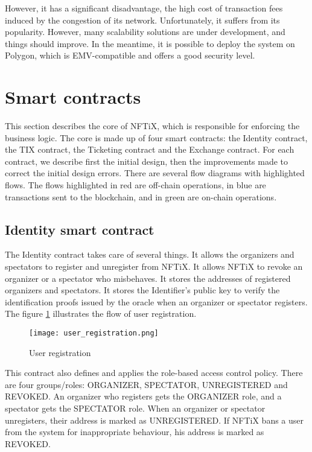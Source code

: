 \documentclass[a4paper,11pt,oneside]{report}
\begin{document}
However, it has a significant disadvantage, the high cost of transaction fees induced by the congestion of its network. Unfortunately, it suffers from its popularity. However, many scalability solutions are under development, and things should improve. In the meantime, it is possible to deploy the system on Polygon, which is EMV-compatible and offers a good security level.

\section{Smart contracts}
This section describes the core of NFTiX, which is responsible for enforcing the business logic. The core is made up of four smart contracts: the Identity contract, the TIX contract, the Ticketing contract and the Exchange contract. For each contract, we describe first the initial design, then the improvements made to correct the initial design errors. There are several flow diagrams with highlighted flows. The flows highlighted in red are off-chain operations, in blue are transactions sent to the blockchain, and in green are on-chain operations.

\subsection{Identity smart contract}
The Identity contract takes care of several things. It allows the organizers and spectators to register and unregister from NFTiX. It allows NFTiX to revoke an organizer or a spectator who misbehaves. It stores the addresses of registered organizers and spectators. It stores the Identifier's public key to verify the identification proofs issued by the oracle when an organizer or spectator registers. The figure \hyperref[fig:user_registration]{\ref{fig:user_registration}} illustrates the flow of user registration.

\begin{figure}[h!]
  \texttt{[image: user\_registration.png]}
  \caption{User registration}
  \label{fig:user_registration}
\end{figure}

This contract also defines and applies the role-based access control policy. There are four groups/roles: ORGANIZER, SPECTATOR, UNREGISTERED and REVOKED. An organizer who registers gets the ORGANIZER role, and a spectator gets the SPECTATOR role. When an organizer or spectator unregisters, their address is marked as UNREGISTERED. If NFTiX bans a user from the system for inappropriate behaviour, his address is marked as REVOKED. 
\end{document}
